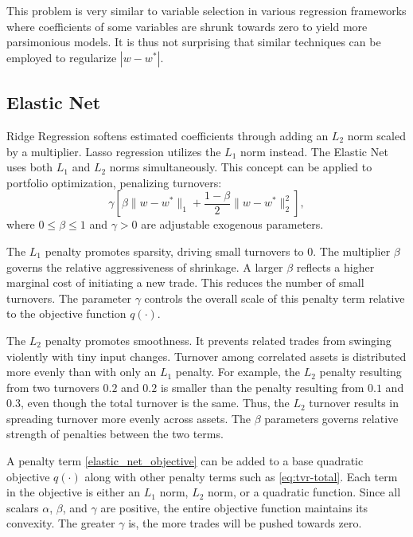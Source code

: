 \documentclass[11pt, letterpaper]{article}
\begin{document}
This problem is very similar to variable selection in various regression frameworks where coefficients of some variables are
shrunk towards zero to yield more parsimonious models. It is thus not surprising that similar techniques can be employed to
regularize $|w - w^*|$.
\subsection{Elastic Net}

Ridge Regression \cite{hoerl1970ridge} softens estimated coefficients through adding an $L_2$ norm scaled by a multiplier. Lasso
regression \cite{tibshirani1996lasso} utilizes the $L_1$ norm instead. The Elastic Net \cite{zou2005elasticnet} uses both $L_1$
and $L_2$ norms simultaneously. This concept can be applied to portfolio optimization, penalizing turnovers:
\begin{equation}
	\label{elastic_net_objective}
	\gamma\left[\beta \lVert w-w^*\rVert_1 + \frac{1 - \beta}{2} \lVert w-w^*\rVert_2^2\right],
\end{equation}
where $0 \leq \beta \leq 1$ and $\gamma > 0$ are adjustable exogenous parameters.

The $L_1$ penalty promotes sparsity, driving small turnovers to $0$. The multiplier $\beta$ governs the relative aggressiveness
of shrinkage. A larger $\beta$ reflects a higher marginal cost of initiating a new trade. This reduces the number of small
turnovers. The parameter $\gamma$ controls the overall scale of this penalty term relative to the objective function $q(\cdot)$.

The $L_2$ penalty promotes smoothness. It prevents related trades from swinging violently with tiny input changes. Turnover
among correlated assets is distributed more evenly than with only an $L_1$ penalty. For example, the $L_2$ penalty resulting
from two turnovers $0.2$ and $0.2$ is smaller than the penalty resulting from $0.1$ and $0.3$, even though the total turnover is
the same. Thus, the $L_2$ turnover results in spreading turnover more evenly across assets. The $\beta$ parameters governs
relative strength of penalties between the two terms.

A penalty term \eqref{elastic_net_objective} can be added to a base quadratic objective $q(\cdot)$ along with other penalty
terms such as \eqref{eq:tvr-total}.  Each term in the objective is either an $L_1$ norm, $L_2$ norm, or a quadratic
function. Since all scalars $\alpha$, $\beta$, and $\gamma$ are positive, the entire objective function maintains its
convexity. The greater $\gamma$ is, the more trades will be pushed towards zero.
\end{document}
